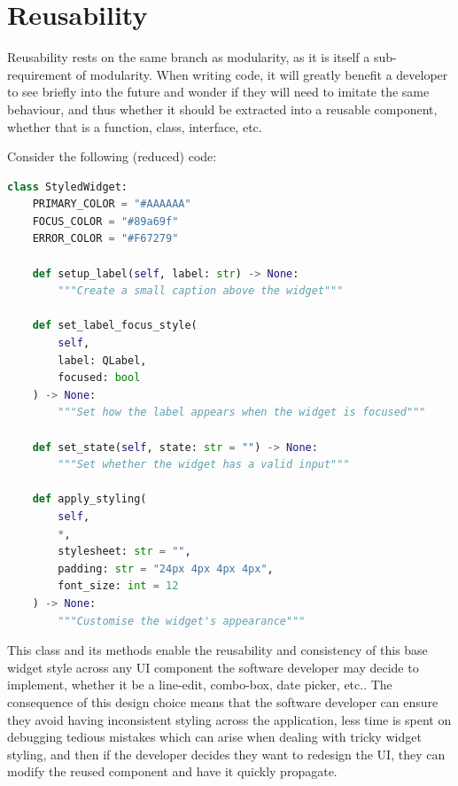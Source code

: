 \documentclass[journal]{IEEEtran}
\begin{document}
	\section{Reusability}
	Reusability rests on the same branch as modularity, as it is itself a sub-requirement of modularity. When writing code, it will greatly benefit a developer to see briefly into the future and wonder if they will need to imitate the same behaviour, and thus whether it should be extracted into a reusable component, whether that is a function, class, interface, etc.
	
	Consider the following (reduced) code:
	
	\begin{lstlisting}[language=Python]
class StyledWidget:
	PRIMARY_COLOR = "#AAAAAA"
	FOCUS_COLOR = "#89a69f"
	ERROR_COLOR = "#F67279"
	
	def setup_label(self, label: str) -> None:
		"""Create a small caption above the widget"""
	
	def set_label_focus_style(
		self,
		label: QLabel,
		focused: bool
	) -> None:
		"""Set how the label appears when the widget is focused"""
	
	def set_state(self, state: str = "") -> None:
		"""Set whether the widget has a valid input"""
	
	def apply_styling(
		self,
		*,
		stylesheet: str = "",
		padding: str = "24px 4px 4px 4px",
		font_size: int = 12
	) -> None:
		"""Customise the widget's appearance"""
	\end{lstlisting}
	
	This class and its methods enable the reusability and consistency of this base widget style across any UI component the software developer may decide to implement, whether it be a line-edit, combo-box, date picker, etc..
	The consequence of this design choice means that the software developer can ensure they avoid having inconsistent styling across the application, less time is spent on debugging tedious mistakes which can arise when dealing with tricky widget styling, and then if the developer decides they want to redesign the UI, they can modify the reused component and have it quickly propagate.
	
\end{document}
